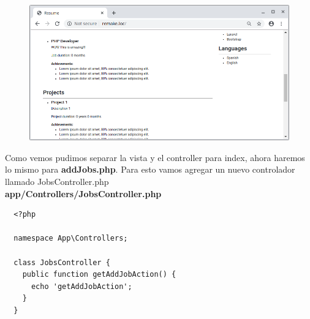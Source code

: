 \documentclass{article}
\begin{document}
\begin{figure}[h!]
  \centering
  \includegraphics[scale=0.5]{./Pictures/129_IndexController_ok.png}
\end{figure}

Como vemos pudimos separar la vista y el controller para index, ahora haremos
lo mismo para \textbf{addJobs.php}. Para esto vamos agregar un nuevo
controlador llamado JobsController.php\\

\textbf{app/Controllers/JobsController.php}
\begin{verbatim}
  <?php

  namespace App\Controllers;

  class JobsController {
    public function getAddJobAction() {
      echo 'getAddJobAction';
    }
  }
\end{verbatim}
\end{document}
